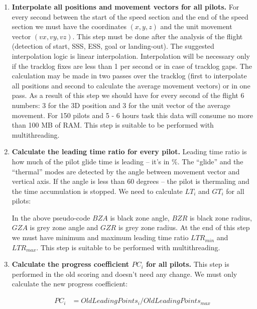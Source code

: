 \documentclass[gap.tex]{subfiles}
\begin{document}
\begin{enumerate}
    \item \textbf{Interpolate all positions and movement vectors for all
        pilots.}  For every second between the start of the speed section and
        the end of the speed section we must have the coordinates \((x, y, z)\)
        and the unit movement vector \((vx, vy, vz)\). This step must be done
        after the analysis of the flight (detection of start, SSS, ESS, goal or
        landing-out). The suggested interpolation logic is linear
        interpolation. Interpolation will be necessary only if the tracklog
        fixes are less than 1 per second or in case of tracklog gaps. The
        calculation may be made in two passes over the tracklog (first to
        interpolate all positions and second to calculate the average movement
        vectors) or in one pass. As a result of this step we should have for
        every second of the flight 6 numbers: 3 for the 3D position and 3 for
        the unit vector of the average movement. For 150 pilots and 5 - 6 hours
        task this data will consume no more than 100 MB of RAM. This step is
        suitable to be performed with multithreading.

    \item \textbf{Calculate the leading time ratio for every pilot.} Leading
        time ratio is how much of the pilot glide time is leading – it’s in \%.
        The “glide” and the “thermal” modes are detected by the angle between
        movement vector and vertical axis. If the angle is less than 60 degrees
        – the pilot is thermaling and the time accumulation is stopped. We need
        to calculate \(LT_i\) and \(GT_i\) for all pilots:

        In the above pseudo-code \(BZA\) is black zone angle, \(BZR\) is black
        zone radius, \(GZA\) is grey zone angle and \(GZR\) is grey zone
        radius. At the end of this step we must have minimum and maximum
        leading time ratio \(LTR_{min}\) and \(LTR_{max}\). This step is
        suitable to be performed with multithreading.

    \item \textbf{Calculate the progress coefficient \(PC_i\) for all pilots.}
        This step is performed in the old scoring and doesn’t need any change.
        We must only calculate the new progress coefficient:
        
        \begin{align*}
            PC_i &= OldLeadingPoints_i / OldLeadingPoints_{max}
        \end{align*}


\end{enumerate}
\end{document}

